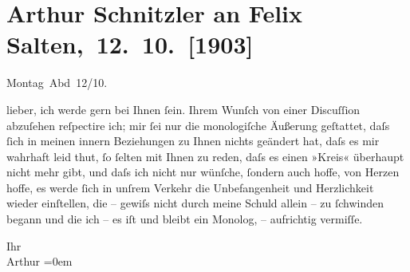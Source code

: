 

\renewcommand{\erwaehntePersonen}{Personen: Felix Salten}
\renewcommand{\erwaehnteOrte}{Orte: Wien}
\renewcommand{\erwaehnteWerke}{}
\section[ Arthur Schnitzler an Felix Salten, 12. 10. {[}1903{]}]{Arthur Schnitzler an Felix Salten, 12. 10. {[}1903{]}}
\nopagebreak{}
\rehead{ }\normalsize\beginnumbering{}
\toendnotes[C]{\smallbreak\pagebreak[2]}
\toendnotes[C]{\smallbreak}
\pstart
           \raggedleft{}{\pb}Montag Abd 12/10.\pend
           
\pstart
           lieber, ich werde \label{K_L02984-1v}\label{K_L02984-1h} gern bei Ihnen ſein. Ihrem Wunſch von einer Discuſſion abzuſehen reſpectire
               ich; mir ſei nur die monologiſche Äußerung geſtattet, daſs ſich in meinen innern
               Beziehungen zu Ihnen nichts geändert hat, daſs es mir wahrhaft leid thut, ſo ſelten
               mit Ihnen zu reden, daſs es {\pb}einen »Kreis«
               überhaupt nicht mehr gibt, und daſs ich nicht nur wünſche, ſondern auch hoffe,  von Herzen hoffe, es werde ſich in unſrem Verkehr
               die Unbefangenheit und Herzlichkeit wieder einſtellen, die – gewiſs nicht durch meine
               Schuld allein – zu ſchwinden begann und die ich – es iſt {\pb}und bleibt ein Monolog, – aufrichtig
               vermiſſe.\pend
           
\pstart
           Ihr {\\[\baselineskip]}\spacefill\mbox{Arthur}\pend
           \leftskip=0em{}\endnumbering{}  
      